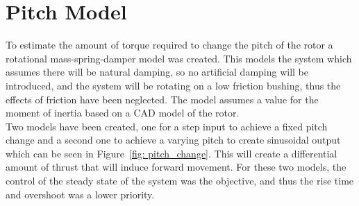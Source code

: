 
        
        \section{Pitch Model}
            To estimate the amount of torque required to change the pitch of the rotor a rotational mass-spring-damper model was created. This models the system which assumes there will be natural damping, so no artificial damping will be introduced, and the system will be rotating on a low friction bushing, thus the effects of friction have been neglected. The model assumes a value for the moment of inertia based on a CAD model of the rotor. \\
            Two models have been created, one for a step input to achieve a fixed pitch change and a second one to achieve a varying pitch to create sinusoidal output which can be seen in Figure~\ref{fig: pitch_change}. This will create a differential amount of thrust that will induce forward movement. For these two models, the control of the steady state of the system was the objective, and thus the rise time and overshoot was a lower priority.
